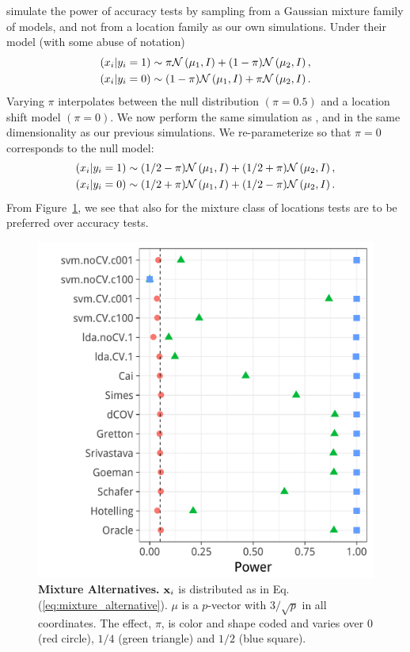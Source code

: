 \documentclass[journal]{IEEEtran}
\begin{document}
\cite{golland_permutation_2005} simulate the power of accuracy tests by sampling from a Gaussian mixture family of models, and not from a location family as our own simulations. 
Under their model (with some abuse of notation)
\begin{align*}
\begin{split}
(x_i|y_i=1) & \sim \pi \mathcal{N}\left(\mu_1,I\right)+ (1-\pi) \mathcal{N}\left(\mu_2,I\right), \\
(x_i|y_i=0) & \sim (1-\pi) \mathcal{N}\left(\mu_1,I\right)+ \pi \mathcal{N}\left(\mu_2,I\right).
\end{split}
\end{align*}
Varying $\pi$ interpolates between the null distribution $(\pi=0.5)$ and a location shift model $(\pi=0)$. 
We now perform the same simulation as \cite{golland_permutation_2005}, and in the same dimensionality as our previous simulations.
We re-parameterize so that $\pi=0$ corresponds to the null model:
\begin{align}
\begin{split}
\label{eq:mixture_alternative}
(x_i|y_i=1) & \sim (1/2-\pi) \gauss{\mu_1,I}+ (1/2+\pi) \gauss{\mu_2,I}, \\
(x_i|y_i=0) & \sim (1/2+\pi) \gauss{\mu_1,I}+ (1/2-\pi) \gauss{\mu_2,I}.	
\end{split}
\end{align}
From Figure~\ref{fig:file12}, we see that also for the mixture class of \cite{golland_permutation_2005} locations tests are to be preferred over accuracy tests. 


\begin{figure}[ht]
	\centering
	\includegraphics[width=0.7\columnwidth]{"art/file12"}
	\caption{\textbf{Mixture Alternatives.} $\mathbf{x}_i$ is distributed as in Eq.(\ref{eq:mixture_alternative}). 
		$\mu$ is a $p$-vector with $3/\sqrt{p}$ in all coordinates.
		The effect, $\pi$, is color and shape coded and varies over $0$ (red circle), $1/4$ (green triangle) and $1/2$ (blue square). }
	\label{fig:file12}
\end{figure}
\end{document}
